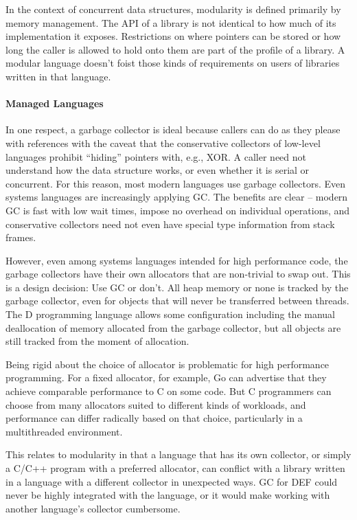 In the context of concurrent data structures, modularity is defined primarily by memory management.  The API of a library is not identical to how much of its implementation it exposes.  Restrictions on where pointers can be stored or how long the caller is allowed to hold onto them are part of the profile of a library.  A modular language doesn't foist those kinds of requirements on users of libraries written in that language.

\paragraph{Managed Languages} In one respect, a garbage collector is ideal because callers can do as they please with references with the caveat that the conservative collectors of low-level languages prohibit ``hiding'' pointers with, e.g., XOR.  A caller need not understand how the data structure works, or even whether it is serial or concurrent.  For this reason, most modern languages use garbage collectors.  Even systems languages are increasingly applying GC.  The benefits are clear -- modern GC is fast with low wait times,\cite{ShahriyarBM14} impose no overhead on individual operations, and conservative collectors need not even have special type information from stack frames.

However, even among systems languages intended for high performance code, the garbage collectors have their own allocators that are non-trivial to swap out.\cite{Go, DotNetGC, D}  This is a design decision: Use GC or don't.  All heap memory or none is tracked by the garbage collector, even for objects that will never be transferred between threads.  The D programming language allows some configuration including the manual deallocation of memory allocated from the garbage collector, but all objects are still tracked from the moment of allocation.\cite{DPhobos}

Being rigid about the choice of allocator is problematic for high performance programming.  For a fixed allocator, for example, Go can advertise that they achieve comparable performance to C on some code.  But C programmers can choose from many allocators suited to different kinds of workloads, and performance can differ radically based on that choice, particularly in a multithreaded environment.\cite{Hoard, TCMalloc, JEMalloc, Supermalloc}

This relates to modularity in that a language that has its own collector, or simply a C/C++ program with a preferred allocator, can conflict with a library written in a language with a different collector in unexpected ways.  GC for DEF could never be highly integrated with the language, or it would make working with another language's collector cumbersome.

